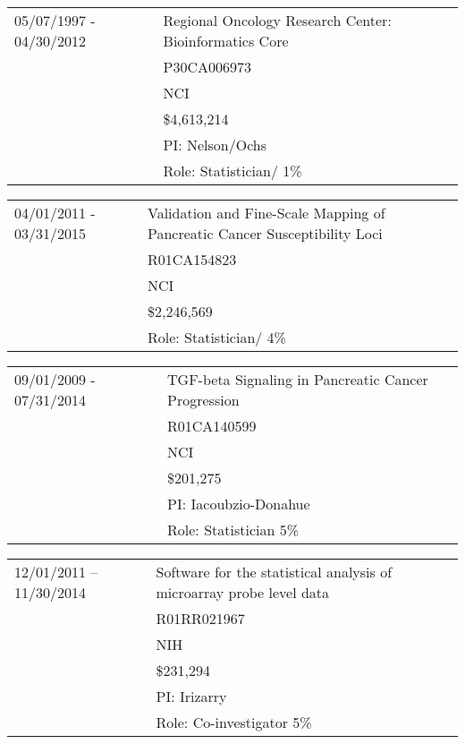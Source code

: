 \documentclass[11pt]{article}%
\begin{document}
\vspace{0.5em}

\begin{tabular}{ll}
05/07/1997 - 04/30/2012& Regional Oncology Research Center: Bioinformatics Core	\\
& P30CA006973 \\
& NCI \\
& \$4,613,214 \\
& PI: Nelson/Ochs \\
& Role: Statistician/ 1\% \\
\end{tabular}

\vspace{0.5em}

\begin{tabular}{ll}
04/01/2011 - 03/31/2015 & Validation and Fine-Scale Mapping of Pancreatic Cancer Susceptibility Loci\\
& R01CA154823 \\
& NCI\\
& \$2,246,569\\
& Role: Statistician/ 4\%\\
\end{tabular}

\vspace{0.5em}

\begin{tabular}{ll}
09/01/2009 - 07/31/2014 & TGF-beta Signaling in Pancreatic Cancer Progression\\
& R01CA140599 \\
& NCI \\
&\$201,275 \\
& PI: Iacoubzio-Donahue \\
& Role: Statistician 5\%\\[2pt]
\end{tabular}

\vspace{0.5em}

\begin{tabular}{ll}
12/01/2011 -- 11/30/2014 & Software for the statistical analysis of microarray probe level data\\
& R01RR021967 \\
& NIH \\
& \$231,294\\
& PI: Irizarry \\
& Role: Co-investigator 5\%\\
\end{tabular}
\end{document}
